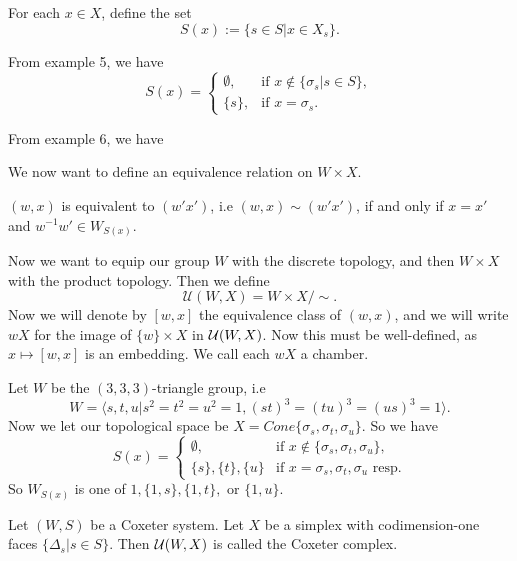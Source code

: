 \documentclass[11pt]{article}
\begin{document}
\begin{definition}
    For each $x\in X$, define the set
    \[S(x):=\{s\in S|x\in X_s\}.\]
\end{definition}

\begin{example}
    From example 5, we have
    \[S(x)=\begin{cases}\emptyset, & \text{if } x\notin \{\sigma_s|s\in S\},\\
        \{s\}, & \text{if } x=\sigma_s.
    \end{cases}\]
\end{example}

\begin{example}
    From example 6, we have
    \[\]
\end{example}

We now want to define an equivalence relation on $W\times X$. 
\begin{definition}
    $(w,x)$ is equivalent to $(w'x')$, i.e $(w,x)\sim (w'x')$, if and only if $x=x'$ and $w^{-1}w'\in W_{S(x)}.$  
\end{definition}

Now we want to equip our group $W$ with the discrete topology, and then $W\times X$ with the product topology. Then we define
\[\mathcal{U}(W,X)=W\times X/\sim.\]
Now we will denote by $[w,x]$ the equivalence class of $(w,x)$, and we will write $wX$ for the image of $\{w\}\times X$ in $\mathcal{U}(W,X)$. Now this must be well-defined, as $x\mapsto [w,x]$ is an embedding. We call each $wX$ a chamber. 

\begin{example}
    Let $W$ be the $(3,3,3)$-triangle group, i.e
    \[W=\langle s,t,u|s^2=t^2=u^2=1,(st)^3=(tu)^3=(us)^3=1\rangle.\]
    Now we let our topological space be $X=Cone\{\sigma_s,\sigma_t,\sigma_u\}$. So we have
    \[S(x)=\begin{cases}
        \emptyset, & \text{if } x\notin \{\sigma_s,\sigma_t,\sigma_u\},\\
        \{s\}, \{t\}, \{u\} & \text{if } x=\sigma_s,\sigma_t,\sigma_u \text{ resp.}
    \end{cases}\]
    So $W_{S(x)}$ is one of $1, \{1,s\},\{1,t\},$ or $\{1,u\}$. 
\end{example}

\begin{definition}
    Let $(W,S)$ be a Coxeter system. Let $X$ be a simplex with codimension-one faces $\{\Delta_s|s\in S\}$. Then $\mathcal{U}(W,X)$ is called the Coxeter complex.
\end{definition}
\end{document}
